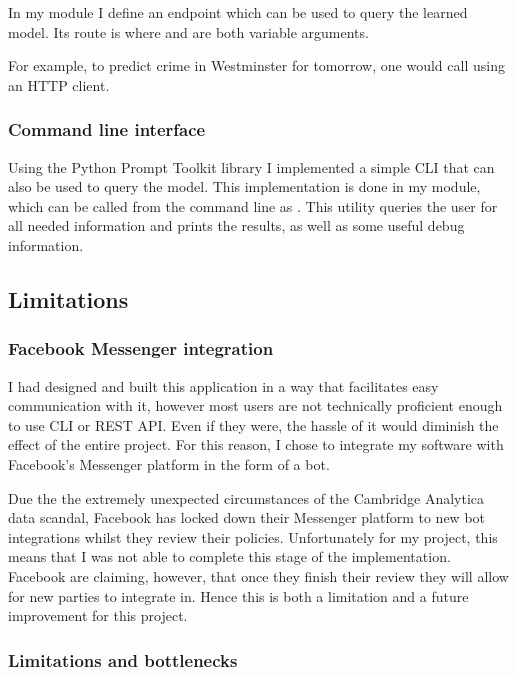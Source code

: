 \documentclass{article}
\begin{document}
	In my  module I define an endpoint which can be used to query the learned model. Its route is  where  and  are both variable arguments.

	For example, to predict crime in Westminster for tomorrow, one would call  using an HTTP client.

	\subsubsection{Command line interface}

	Using the Python Prompt Toolkit library I implemented a simple CLI that can also be used to query the model. This implementation is done in my  module, which can be called from the command line as . This utility queries the user for all needed information and prints the results, as well as some useful debug information.

	\subsection{Limitations}

	\subsubsection{Facebook Messenger integration}

	I had designed and built this application in a way that facilitates easy communication with it, however most users are not technically proficient enough to use CLI or REST API. Even if they were, the hassle of it would diminish the effect of the entire project. For this reason, I chose to integrate my software with Facebook's Messenger platform in the form of a bot.

	Due the the extremely unexpected circumstances of the Cambridge Analytica data scandal, Facebook has locked down their Messenger platform to new bot integrations whilst they review their policies. Unfortunately for my project, this means that I was not able to complete this stage of the implementation. Facebook are claiming, however, that once they finish their review they will allow for new parties to integrate in. Hence this is both a limitation and a future improvement for this project.

	\subsubsection{Limitations and bottlenecks}
\end{document}
